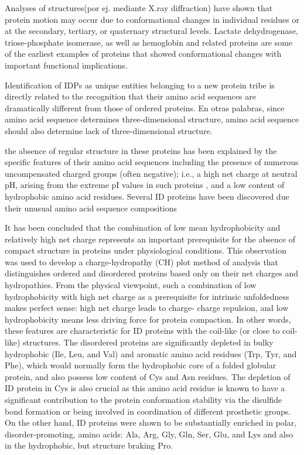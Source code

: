 Analyses of structures(por ej. mediante X.ray diffraction) have shown that protein motion may occur due to conformational changes in individual residues or at the secondary, tertiary, or quaternary structural levels. Lactate dehydrogenase, triose-phosphate isomerase, as well as hemoglobin and related proteins are some of the earliest examples of proteins that showed conformational changes with important functional implications.







Identification of IDPs as unique entities belonging to a new protein tribe is directly related to the recognition that their amino acid sequences are dramatically different from those of ordered proteins.
En otras palabras, since amino acid sequence determines three-dimensional structure, amino acid sequence should also determine lack of three-dimensional structure.


the absence of regular structure in these proteins has been explained by the specific features of their amino acid sequences including the presence of numerous uncompensated charged groups (often negative); 
 i.e., a high net charge at neutral pH, arising from the extreme pI values in such proteins , and a low content of hydrophobic amino acid residues.
Several ID proteins have been discovered due their unusual amino acid sequence compositions

It has been concluded that the combination of low mean hydrophobicity and relatively high net charge represents an important prerequisite for the absence of compact structure in proteins under physiological conditions. This observation was used to develop a charge-hydropathy (CH) plot method of analysis that distinguishes ordered and disordered proteins based only on their net charges and hydropathies.
From the physical viewpoint, such a combination of low hydrophobicity with high net charge as a prerequisite for intrinsic unfoldedness makes perfect sense: high net charge leads to charge-
charge repulsion, and low hydrophobicity means less driving force for protein compaction. In other words, these features are characteristic for ID proteins with the coil-like (or close to coil-
like) structures.
The disordered proteins are significantly depleted in bulky hydrophobic (Ile, Leu, and Val) and aromatic amino acid residues (Trp, Tyr, and Phe), which would normally form the hydrophobic core of a folded globular protein, and also possess low content of Cys and Asn residues.
The depletion of ID protein in Cys is also crucial as this amino acid residue is known to have a significant contribution to the protein conformation stability via the disulfide bond formation or being involved in coordination of different prosthetic groups.
On the other hand, ID proteins were shown to be substantially enriched in polar, disorder-promoting, amino acids: Ala, Arg, Gly, Gln, Ser, Glu, and Lys and also in the hydrophobic, but structure braking Pro.

